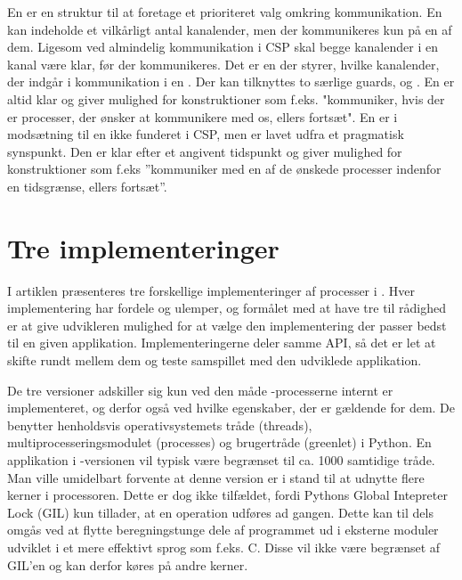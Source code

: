 En  er en struktur til at foretage et prioriteret valg omkring kommunikation. En  kan indeholde et vilkårligt antal kanalender, men der kommunikeres kun på en af dem. Ligesom ved almindelig kommunikation i CSP skal begge kanalender i en kanal være klar, før der kommunikeres. Det er en   der styrer, hvilke kanalender, der indgår i kommunikation i en . Der kan tilknyttes to særlige guards,  og . En  er altid klar og giver mulighed for konstruktioner som f.eks. "kommuniker, hvis der er processer, der ønsker at kommunikere med os, ellers fortsæt". En  er i modsætning til en  ikke funderet i CSP, men er lavet udfra et pragmatisk synspunkt. Den er klar efter et angivent tidspunkt og giver mulighed for konstruktioner som f.eks ''kommuniker med en af de ønskede processer indenfor en tidsgrænse, ellers fortsæt''. 

\section{Tre implementeringer}
I artiklen \cite{Friborg2009} præsenteres tre forskellige implementeringer af processer i \pycsp. Hver implementering har fordele og ulemper, og formålet med at have tre til rådighed er at give udvikleren mulighed for at vælge den implementering der passer bedst til en given applikation. Implementeringerne deler samme API, så det er let at skifte rundt mellem dem og teste samspillet med den udviklede applikation. 

De tre versioner adskiller sig kun ved den måde \csp-processerne internt er implementeret, og derfor også ved hvilke egenskaber, der er gældende for dem. De benytter henholdsvis operativsystemets tråde (threads), multiprocesseringsmodulet (processes) og brugertråde (greenlet) i Python. En applikation i -versionen vil typisk være begrænset til ca. 1000 samtidige tråde\cite[3]{Friborg2009}. Man ville umidelbart forvente at denne version er i stand til at udnytte flere kerner i processoren. Dette er dog ikke tilfældet, fordi Pythons Global Intepreter Lock (GIL) kun tillader, at en operation udføres ad gangen. Dette kan til dels omgås ved at flytte beregningstunge dele af programmet ud i eksterne moduler udviklet i et mere effektivt sprog som f.eks. C. Disse vil ikke være begrænset af GIL'en og kan derfor køres på andre kerner. 

